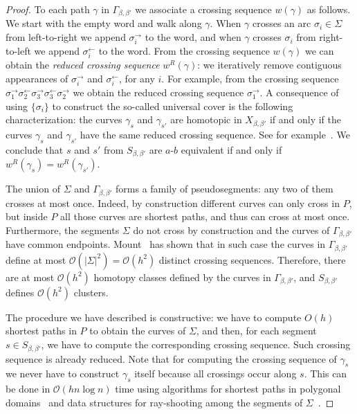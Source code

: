 \documentclass[11pt,a4paper]{article}
\begin{document}
\begin{proof}
To each path $\gamma$ in $\Gamma_{\beta,\beta'}$ we associate a crossing sequence $w(\gamma)$ as follows. We start with the empty word and walk along $\gamma$. When $\gamma$ crosses an arc $\sigma_i\in \Sigma$ from left-to-right we append $\sigma_i^\rightarrow$ to the word, and when $\gamma$ crosses $\sigma_i$ from right-to-left we append  $\sigma_i^\leftarrow$ to the word. From the crossing sequence $w(\gamma)$ we can obtain the \emph{reduced crossing sequence}  $w^R(\gamma)$: we iteratively remove contiguous appearances of $\sigma_i^\rightarrow$ and $\sigma_i^\leftarrow$, for any $i$. For example, from the crossing sequence $\sigma_1^\rightarrow \sigma_2^\leftarrow \sigma_3^\rightarrow \sigma_3^\leftarrow \sigma_2^\rightarrow$ we obtain the reduced crossing sequence $\sigma_1^\rightarrow$. A consequence of using $\{ \sigma_i \}$ to construct the so-called universal cover is the following characterization:
the curves $\gamma_s$ and $\gamma_{s'}$ are homotopic in $X_{\beta,\beta'}$ if and only if the curves $\gamma_s$ and $\gamma_{s'}$ have the same reduced crossing sequence. See for example~\cite{clms-04}. We conclude that $s$ and $s'$ from $S_{\beta,\beta'}$ are $a$-$b$ equivalent if and only if 
$w^R(\gamma_s)= w^R(\gamma_{s'})$.

The union of $\Sigma$ and $\Gamma_{\beta,\beta'}$ forms a family of pseudosegments: any two of them crosses at most once.
Indeed, by construction different curves can only cross in $P$, but inside $P$ all those curves are shortest paths, and thus can cross at most once.
Furthermore, the segments $\Sigma$ do not cross by construction and the curves of $\Gamma_{\beta,\beta'}$ have common endpoints.
Mount~\cite[Theorem 1.1]{mount-90} has shown that in such case the curves in $\Gamma_{\beta,\beta'}$ 
define at most ${\mathcal O}(|\Sigma|^2)={\mathcal O}(h^2)$ distinct crossing sequences. Therefore, there are at most ${\mathcal O}(h^2)$ homotopy classes defined
by the curves in $\Gamma_{\beta,\beta'}$, and $S_{\beta,\beta'}$ defines ${\mathcal O}(h^2)$ clusters. 

The procedure we have described is constructive: we have to compute $O(h)$ shortest paths in $P$ to obtain the curves of $\Sigma$, and then, for each segment $s\in S_{\beta,\beta'}$, we have to compute the corresponding crossing sequence. Such crossing sequence is already reduced. Note that for computing the crossing sequence of $\gamma_s$ we never have to construct $\gamma_s$ itself because all crossings occur along $s$.
This can be done in ${\mathcal O}(h n\log n)$ time using algorithms for shortest paths in polygonal domains~\cite{hs-oaesp-99} and data structures for ray-shooting among the segments of $\Sigma$~\cite{ray-shooting}.
\end{proof}
\end{document}
